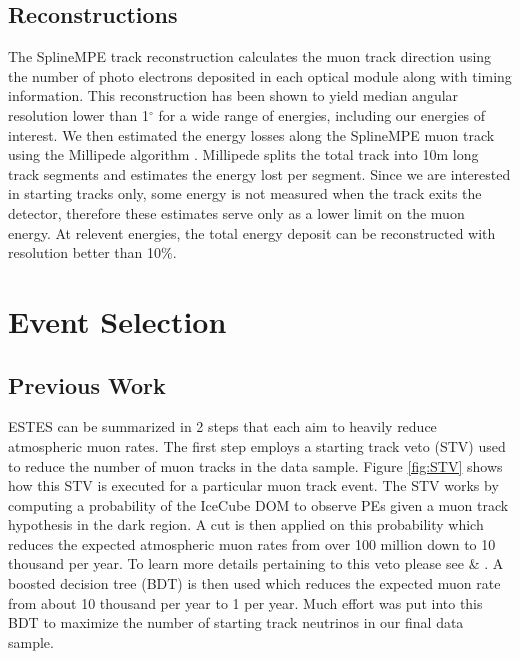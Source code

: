 \documentclass{PoS}
\begin{document}
\subsection{Reconstructions}\label{sec:Reco}
The SplineMPE track reconstruction \cite{angular_res} calculates the muon track direction using the number of photo electrons deposited in each optical module along with timing information. This reconstruction has been shown to yield median angular resolution lower than 1$^\circ$ for a wide range of energies, including our energies of interest. We then estimated the energy losses along the SplineMPE muon track using the Millipede algorithm \cite{energy_res}. Millipede splits the total track into 10m long track segments and estimates the energy lost per segment. Since we are interested in starting tracks only, some energy is not measured when the track exits the detector, therefore these estimates serve only as a lower limit on the muon energy. At relevent energies, the total energy deposit can be reconstructed with resolution better than 10$\%$.


\section{Event Selection}\label{sec:ESTES}
\subsection{Previous Work}\label{sec:ESTES_startingtrack}
ESTES can be summarized in 2 steps that each aim to heavily reduce atmospheric muon rates. The first step employs a starting track veto (STV) used to reduce the number of muon tracks in the data sample. Figure \ref{fig:STV} shows how this STV is executed for a particular muon track event. The STV works by computing a probability of the IceCube DOM to observe PEs given a muon track hypothesis in the dark region. A cut is then applied on this probability which reduces the expected atmospheric muon rates from over 100 million down to 10 thousand per year. To learn more details pertaining to this veto please see \cite{Kyle:ESTES} \& \cite{Mancina:ESTES}. A boosted decision tree (BDT) is then used which reduces the expected muon rate from about 10 thousand per year to 1 per year. Much effort was put into this BDT to maximize the number of starting track neutrinos in our final data sample.
\end{document}
